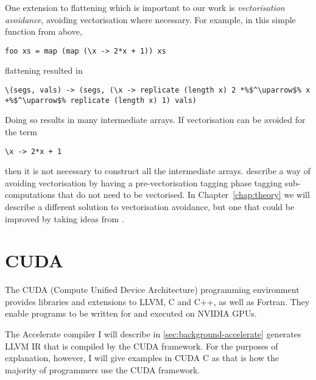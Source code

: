 One extension to flattening which is important to our work is \emph{vectorisation avoidance}, avoiding vectorisation where necessary. For example, in this simple function from above,
%
\begin{lstlisting}
foo xs = map (map (\x -> 2*x + 1)) xs
\end{lstlisting}
%
flattening resulted in
%
%
\begin{lstlisting}
\(segs, vals) -> (segs, (\x -> replicate (length x) 2 *%$^\uparrow$% x +%$^\uparrow$% replicate (length x) 1) vals)
\end{lstlisting}
%
Doing so results in many intermediate arrays. If vectorisation can be avoided for the term
%
\begin{lstlisting}
\x -> 2*x + 1
\end{lstlisting}
%
then it is not necessary to construct all the intermediate arrays. \citet{Keller:avoidance} describe a way of avoiding vectorisation by having a pre-vectorisation tagging phase tagging sub-computations that do not need to be vectorised. In Chapter~\ref{chap:theory} we will describe a different solution to vectorisation avoidance, but one that could be improved by taking ideas from \citet{Keller:avoidance}.

\section{CUDA}
\label{sec:cuda}

The CUDA (Compute Unified Device Architecture)\cite{cuda} programming environment provides libraries and extensions to LLVM, C and C++, as well as Fortran. They enable programs to be written for and executed on NVIDIA GPUs.

The Accelerate compiler I will describe in \ref{sec:background-accelerate} generates LLVM IR that is compiled by the CUDA framework. For the purposes of explanation, however, I will give examples in CUDA C as that is how the majority of programmers use the CUDA framework.


